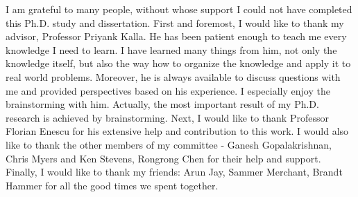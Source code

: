 I am grateful to many people, without whose support I could not have completed this
Ph.D. study and dissertation. First and foremost, I would like to thank my advisor, 
Professor Priyank Kalla. He has been patient enough to teach me every knowledge I need to learn. 
I have learned many things from him, not only the knowledge itself, but also the way
how to organize the knowledge and apply it to real world problems.
Moreover, he is always available to discuss questions with me and 
provided perspectives based on his experience. I especially enjoy the brainstorming with him.
Actually, the most important result of my Ph.D. research is achieved by brainstorming.
Next, I would like to thank Professor Florian Enescu for
his extensive help and contribution to this work.
I would also like to thank the other members of my committee - Ganesh Gopalakrishnan,
Chris Myers and Ken Stevens, Rongrong Chen for their help and support.
Finally, I would like to thank my friends: Arun Jay, Sammer Merchant, Brandt Hammer for all the good times
we spent together.
